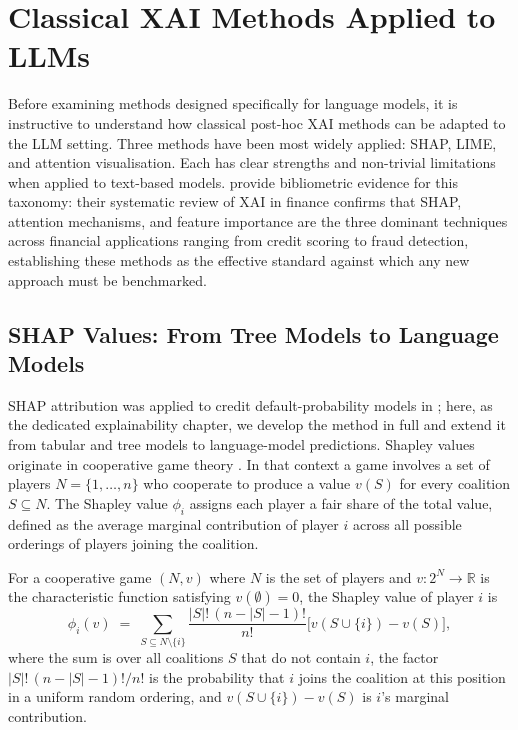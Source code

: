\section{Classical XAI Methods Applied to LLMs}
\label{sec:ch12-classical-xai}

Before examining methods designed specifically for language models, it is instructive to
understand how classical post-hoc XAI methods can be adapted to the LLM setting. Three
methods have been most widely applied: SHAP, LIME, and attention visualisation. Each has
clear strengths and non-trivial limitations when applied to text-based models. \citet{MohsinNasim2025} provide bibliometric evidence for this taxonomy: their
systematic review of XAI in finance confirms that SHAP, attention mechanisms, and
feature importance are the three dominant techniques across financial applications
ranging from credit scoring to fraud detection, establishing these methods as the
effective standard against which any new approach must be benchmarked.

\subsection{SHAP Values: From Tree Models to Language Models}
\label{sec:ch12-shap-values}

SHAP attribution was applied to credit default-probability models in
; here, as the dedicated explainability chapter, we develop the
method in full and extend it from tabular and tree models to language-model predictions.
Shapley values originate in cooperative game theory \cite{shapley1953value}. In that
context a game involves a set of players $N = \{1, \ldots, n\}$ who cooperate to produce
a value $v(S)$ for every coalition $S \subseteq N$. The Shapley value $\phi_i$ assigns
each player a fair share of the total value, defined as the average marginal contribution
of player $i$ across all possible orderings of players joining the coalition.

\begin{definition}
\label{def:shapley-value}
For a cooperative game $(N, v)$ where $N$ is the set of players and $v: 2^N \to \mathbb{R}$
is the characteristic function satisfying $v(\emptyset) = 0$, the Shapley value of
player $i$ is
\begin{equation}
\label{eq:shapley-value}
\phi_i(v) \;=\; \sum_{S \subseteq N \setminus \{i\}} \frac{|S|!\,(n - |S| - 1)!}{n!}
\bigl[v(S \cup \{i\}) - v(S)\bigr],
\end{equation}
where the sum is over all coalitions $S$ that do not contain $i$, the factor
$|S|!\,(n - |S| - 1)!/n!$ is the probability that $i$ joins the coalition at this
position in a uniform random ordering, and $v(S \cup \{i\}) - v(S)$ is $i$'s marginal
contribution.
\end{definition}

